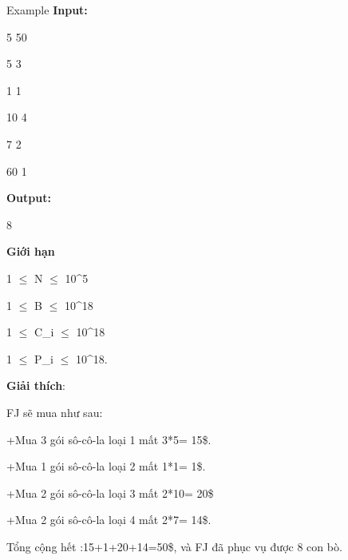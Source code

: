 Example
\textbf{Input:}


5 50


5 3


1 1


10 4


7 2


60 1


\textbf{Output:}


8








\textbf{​Giới hạn}





1 $\le$ N $\le$ 10^5


1  $\le$  B  $\le$  10^18


1  $\le$  C\_i  $\le$  10^18


1  $\le$  P\_i  $\le$  10^18.





\textbf{Giải thích}:


FJ sẽ mua như sau:


+Mua 3 gói sô-cô-la loại 1 mất 3*5= 15\$.


+Mua 1 gói sô-cô-la loại 2 mất 1*1= 1\$.


+Mua 2 gói sô-cô-la loại 3 mất 2*10= 20\$


+Mua 2 gói sô-cô-la loại 4 mất 2*7= 14\$.


Tổng cộng hết :15+1+20+14=50\$, và FJ đã phục vụ được 8 con bò.